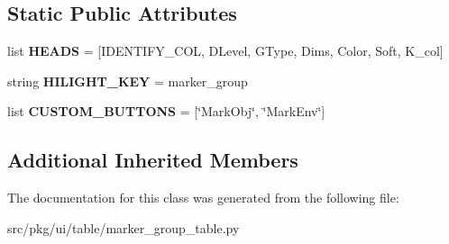 \subsection*{Static Public Attributes}
\begin{DoxyCompactItemize}
\item 
\mbox{\label{classrnb-planning_1_1src_1_1pkg_1_1ui_1_1table_1_1marker__group__table_1_1_marker_group_table_ad9da762f213719a75c2d003763e4ad08}} 
list {\bfseries H\+E\+A\+DS} = \mbox{[}I\+D\+E\+N\+T\+I\+F\+Y\+\_\+\+C\+OL, \textquotesingle{}D\+Level\textquotesingle{}, \textquotesingle{}G\+Type\textquotesingle{}, \textquotesingle{}Dims\textquotesingle{}, \textquotesingle{}Color\textquotesingle{}, \textquotesingle{}Soft\textquotesingle{}, \textquotesingle{}K\+\_\+col\textquotesingle{}\mbox{]}
\item 
\mbox{\label{classrnb-planning_1_1src_1_1pkg_1_1ui_1_1table_1_1marker__group__table_1_1_marker_group_table_a3e2a039d357d639ca4062f372448d38a}} 
string {\bfseries H\+I\+L\+I\+G\+H\+T\+\_\+\+K\+EY} = \textquotesingle{}marker\+\_\+group\textquotesingle{}
\item 
\mbox{\label{classrnb-planning_1_1src_1_1pkg_1_1ui_1_1table_1_1marker__group__table_1_1_marker_group_table_a952c6afa1ef19f974531cbdb734428da}} 
list {\bfseries C\+U\+S\+T\+O\+M\+\_\+\+B\+U\+T\+T\+O\+NS} = \mbox{[}\char`\"{}Mark\+Obj\char`\"{}, \char`\"{}Mark\+Env\char`\"{}\mbox{]}
\end{DoxyCompactItemize}
\subsection*{Additional Inherited Members}


The documentation for this class was generated from the following file\+:\begin{DoxyCompactItemize}
\item 
src/pkg/ui/table/marker\+\_\+group\+\_\+table.\+py\end{DoxyCompactItemize}
